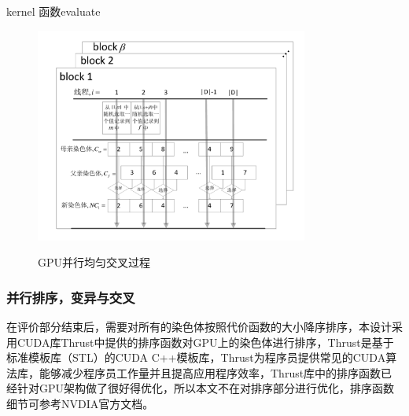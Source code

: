 \begin{algorithm}[t]
\begin{algorithmic}[1]
\EndFor
{}
\Else
{}
\EndIf
{}
\EndIf
{}
\EndWhile
{}
\EndFunction
\end{algorithmic}
\caption{kernel 函数evaluate}
\label{evaluate}
\end{algorithm}

\begin{figure}
\setlength{\abovecaptionskip}{-0.5cm}
\begin{center}
{\includegraphics[width=0.8\textwidth]{figures/GPUcross.pdf}}
\end{center}
\caption{{\footnotesize{GPU并行均匀交叉过程}}}
\label{cross}
\end{figure}
\subsubsection{并行排序，变异与交叉}
在评价部分结束后，需要对所有的染色体按照代价函数的大小降序排序，本设计采用CUDA库Thrust中提供的排序函数对GPU上的染色体进行排序，Thrust是基于标准模板库（STL）的CUDA C++模板库，Thrust为程序员提供常见的CUDA算法库，能够减少程序员工作量并且提高应用程序效率，Thrust库中的排序函数已经针对GPU架构做了很好得优化，所以本文不在对排序部分进行优化，排序函数细节可参考NVDIA官方文档。

